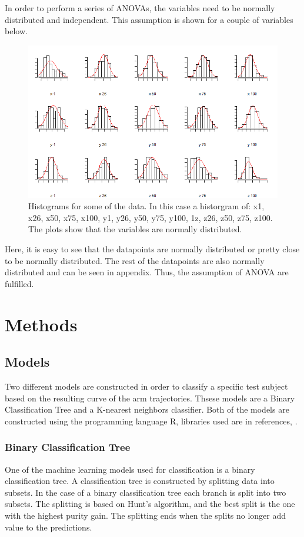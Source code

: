 \documentclass[11pt, fleqn, titlepage]{article}
\begin{document}
\noindent In order to perform a series of ANOVAs, the variables need to be normally distributed and independent. This assumption is shown for a couple of variables below.

\begin{figure}[H]
	\centering
	\includegraphics[width=0.65\linewidth]{billeder/normalAF}
	\caption{Histograms for some of the data. In this case a historgram of: x1, x26, x50, x75, x100, y1, y26, y50, y75, y100, 1z, z26, z50, z75, z100. The plots show that the variables are normally distributed.}
	\label{fig:normalaf}
\end{figure}

\noindent Here, it is easy to see that the datapoints are normally distributed or pretty close to be normally distributed. The rest of the datapoints are also normally distributed and can be seen in appendix. Thus, the assumption of ANOVA are fulfilled.  

\section{Methods}

\subsection*{Models} \vspace*{-0.2cm}
Two different models are constructed in order to classify a specific test subject based on the resulting curve of the arm trajectories. Thsese models are a Binary Classification Tree and a K-nearest neighbors classifier. Both of the models are constructed using the programming language R, libraries used are in references, \cite{KNN, Tree}.
\vspace*{-0.2cm}
\subsubsection*{Binary Classification Tree}  \vspace*{-0.2cm}
One of the machine learning models used for classification is a binary classification tree. A classification tree is constructed by splitting data into subsets. In the case of a binary classification tree each branch is split into two subsets. The splitting is based on Hunt's algorithm, and the best split is the one with the highest purity gain. The splitting ends when the splits no longer add value to the predictions.
\vspace*{-0.2cm}
\end{document}
